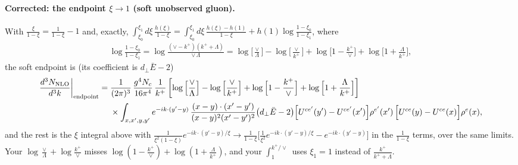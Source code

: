\documentclass[9pt]{article}
\numberwithin{equation}{section}
\begin{document}
{\paragraph{Corrected: the endpoint $\xi\to1$ (soft unobserved gluon).} With $\frac{\xi}{1-\xi}=\frac{1}{1-\xi}-1$ and, exactly, $\int_{\xi_0}^{\xi_1}d\xi\,\frac{h(\xi)}{1-\xi}=\int_{\xi_0}^{\xi_1}d\xi\,\frac{h(\xi)-h(1)}{1-\xi}+h(1)\log\frac{1-\xi_0}{1-\xi_1}$, where
\begin{align}
\log\frac{1-\xi_{0}}{1-\xi_{1}}=\log\frac{(\vee-k^{+})(k^{+}+\Lambda)}{\vee\,\Lambda}=\log\Big[\frac{\vee}{\Lambda}\Big]-\log\Big[\frac{\vee}{k^{+}}\Big]+\log\Big[1-\frac{k^{+}}{\vee}\Big]+\log\Big[1+\frac{\Lambda}{k^{+}}\Big],
\end{align}
the soft endpoint is (its coefficient is $d_\perp\bar E-2$)
\begin{align}
\frac{d^{3}N_{\rm NLO}}{d^{3}k}\bigg|_{\rm endpoint} ={}& \frac{1}{(2\pi)^{3}}\,\frac{g^{4}N_{c}}{16\pi^{4}}\,\frac{1}{k^{+}}\left[\log\Big[\frac{\vee}{\Lambda}\Big]-\log\Big[\frac{\vee}{k^{+}}\Big]+\log\Big[1-\frac{k^{+}}{\vee}\Big]+\log\Big[1+\frac{\Lambda}{k^{+}}\Big]\right]\notag\\
&\times\int_{x,x',y,y'}e^{-ik\cdot(y'-y)}\,\frac{(x-y)\cdot(x'-y')}{(x-y)^{2}(x'-y')^{2}}\big(d_\perp\bar E-2\big)\Big[U^{ce'}(y')-U^{ce'}(x')\Big]\rho^{e'}(x')\,\Big[U^{ce}(y)-U^{ce}(x)\Big]\rho^{e}(x),
\end{align}
and the rest is the $\xi$ integral above with $\frac{1}{\xi^{2}(1-\xi)}e^{-ik\cdot(y'-y)/\xi}\to\frac{1}{1-\xi}\big[\frac{1}{\xi^{2}}e^{-ik\cdot(y'-y)/\xi}-e^{-ik\cdot(y'-y)}\big]$ in the $\frac{1}{1-\xi}$ terms, over the same limits. Your $\log\frac{\vee}{\Lambda}+\log\frac{k^{+}}{\vee}$ misses $\log(1-\frac{k^{+}}{\vee})+\log(1+\frac{\Lambda}{k^{+}})$, and your $\int_{1}^{k^{+}/\vee}$ uses $\xi_1=1$ instead of $\frac{k^{+}}{k^{+}+\Lambda}$.
}
\end{document}
